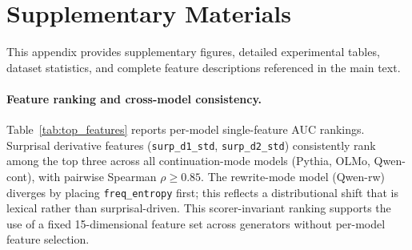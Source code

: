 \appendix
\setlength{\floatsep}{6pt plus 2pt minus 2pt}
\setlength{\textfloatsep}{8pt plus 2pt minus 2pt}
\setlength{\intextsep}{6pt plus 2pt minus 2pt}
\setlength{\abovecaptionskip}{4pt}
\setlength{\belowcaptionskip}{2pt}
\section{Supplementary Materials}
\label{sec:appendix}

This appendix provides supplementary figures, detailed experimental tables, dataset statistics, and complete feature descriptions referenced in the main text.

\paragraph{Feature ranking and cross-model consistency.}
Table~\ref{tab:top_features} reports per-model single-feature AUC rankings.
Surprisal derivative features (\texttt{surp\_d1\_std}, \texttt{surp\_d2\_std}) consistently rank among the top three across all continuation-mode models (Pythia, OLMo, Qwen-cont), with pairwise Spearman $\rho \geq 0.85$.
The rewrite-mode model (Qwen-rw) diverges by placing \texttt{freq\_entropy} first; this reflects a distributional shift that is lexical rather than surprisal-driven.
This scorer-invariant ranking supports the use of a fixed 15-dimensional feature set across generators without per-model feature selection.

\begin{table}[!htbp]
\centering
\small
\caption{Top-3 features by single-feature $\auc$ ranking. Bold: shared across all continuation-mode models. Spearman $\rho$ (continuation pairs): Pythia--OLMo 0.95, Pythia--Qwen-cont 0.91, OLMo--Qwen-cont 0.85.}
\label{tab:top_features}
\end{table}

